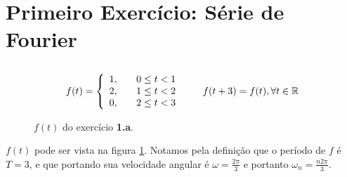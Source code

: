 \section{Primeiro Exercício: Série de Fourier}

\subsection{}

\begin{equation}\displaystyle
f(t) = \left\{ 
\begin{array}{l l}
  1, & \quad 0 \le t < 1 \\
  2, & \quad 1 \le t < 2 \\
  0, & \quad 2 \le t < 3 \\
\end{array} \right. \quad \quad f(t+3) = f(t), \forall t \in \mathbb{R}
\end{equation}

\begin{figure}
  \caption{\small{$f(t)$ do exercício \textbf{1.a}.}}
  \label{fig:1a-f}
\end{figure}

$f(t)$ pode ser vista na figura \ref{fig:1a-f}. Notamos pela definição que o período de $f$ é $T = 3$, e que portando sua velocidade angular é $\omega = \frac{2\pi}{3}$ e portanto $\omega_n = \frac{n2\pi}{3}$.

